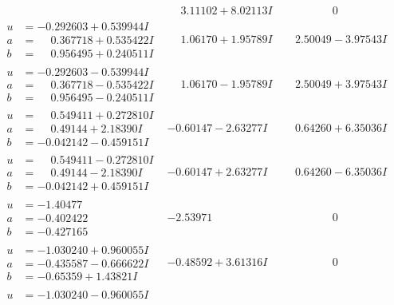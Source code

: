 \documentclass[1p]{elsarticle_modified}
\theoremstyle{definition}
\begin{document}
$$\begin{array}{c|c|c}
 & \phantom{-}3.11102 + 8.02113 I & \phantom{-0.000000 } 0 \\ \hline\begin{aligned}
u &= -0.292603 + 0.539944 I \\
a &= \phantom{-}0.367718 + 0.535422 I \\
b &= \phantom{-}0.956495 + 0.240511 I\end{aligned}
 & \phantom{-}1.06170 + 1.95789 I & \phantom{-}2.50049 - 3.97543 I \\ \hline\begin{aligned}
u &= -0.292603 - 0.539944 I \\
a &= \phantom{-}0.367718 - 0.535422 I \\
b &= \phantom{-}0.956495 - 0.240511 I\end{aligned}
 & \phantom{-}1.06170 - 1.95789 I & \phantom{-}2.50049 + 3.97543 I \\ \hline\begin{aligned}
u &= \phantom{-}0.549411 + 0.272810 I \\
a &= \phantom{-}0.49144 + 2.18390 I \\
b &= -0.042142 - 0.459151 I\end{aligned}
 & -0.60147 - 2.63277 I & \phantom{-}0.64260 + 6.35036 I \\ \hline\begin{aligned}
u &= \phantom{-}0.549411 - 0.272810 I \\
a &= \phantom{-}0.49144 - 2.18390 I \\
b &= -0.042142 + 0.459151 I\end{aligned}
 & -0.60147 + 2.63277 I & \phantom{-}0.64260 - 6.35036 I \\ \hline\begin{aligned}
u &= -1.40477\phantom{ +0.000000I} \\
a &= -0.402422\phantom{ +0.000000I} \\
b &= -0.427165\phantom{ +0.000000I}\end{aligned}
 & -2.53971\phantom{ +0.000000I} & \phantom{-0.000000 } 0 \\ \hline\begin{aligned}
u &= -1.030240 + 0.960055 I \\
a &= -0.435587 - 0.666622 I \\
b &= -0.65359 + 1.43821 I\end{aligned}
 & -0.48592 + 3.61316 I & \phantom{-0.000000 } 0 \\ \hline\begin{aligned}
u &= -1.030240 - 0.960055 I \\

\end{aligned}
\end{array}$$
\end{document}
